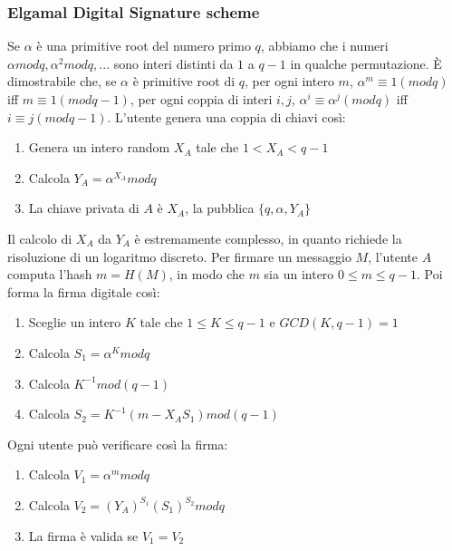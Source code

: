 \documentclass[11pt]{article}
\begin{document}
\subsubsection{Elgamal Digital Signature scheme}
Se $\alpha$ è una primitive root del numero primo $q$, abbiamo che i numeri $\alpha mod q, \alpha^2 mod q,...$ sono interi distinti da $1$ a $q-1$ in qualche permutazione. È dimostrabile che, se $\alpha$ è primitive root di $q$, per ogni intero $m$, $\alpha^m \equiv 1 (mod q)$ iff $m \equiv 1 (mod q-1)$, per ogni coppia di interi $i,j$, $\alpha^i \equiv \alpha^j (mod q)$ iff $i \equiv j (mod q-1)$.
L'utente genera una coppia di chiavi così:
\begin{enumerate}
    \item Genera un intero random $X_A$ tale che $1 < X_A < q-1$
    \item Calcola $Y_A = \alpha^{X_A} mod q$
    \item La chiave privata di $A$ è $X_A$, la pubblica $\{q,\alpha,Y_A\}$
\end{enumerate}
Il calcolo di $X_A$ da $Y_A$ è estremamente complesso, in quanto richiede la risoluzione di un logaritmo discreto.
Per firmare un messaggio $M$, l'utente $A$ computa l'hash $m=H(M)$, in modo che $m$ sia un intero $0 \le m \le q-1$. Poi forma la firma digitale così:
\begin{enumerate}
    \item Sceglie un intero $K$ tale che $1 \le K \le q-1$ e $GCD(K,q-1)=1$
    \item Calcola $S_1 = \alpha^K mod q$
    \item Calcola $K^{-1} mod (q-1)$
    \item Calcola $S_2 = K^{-1}(m-X_AS_1) mod (q-1)$
\end{enumerate}
Ogni utente può verificare così la firma:
\begin{enumerate}
    \item Calcola $V_1 = \alpha^m mod q$
    \item Calcola $V_2 = (Y_A)^{S_1}(S_1)^{S_2} mod q$
    \item La firma è valida se $V_1 = V_2$
\end{enumerate} 
\end{document}
